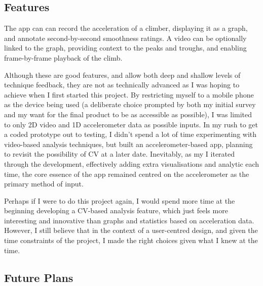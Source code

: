 \subsection{Features}
The app can can record the acceleration of a climber, displaying it as a graph, and annotate second-by-second smoothness ratings.
A video can be optionally linked to the graph, providing context to the peaks and troughs, and enabling frame-by-frame playback of the climb.

Although these are good features, and allow both deep and shallow levels of technique feedback, they are not as technically advanced as I was hoping to achieve when I first started this project.
By restricting myself to a mobile phone as the device being used (a deliberate choice prompted by both my initial survey and my want for the final product to be as accessible as possible), I was limited to only 2D video and 1D accelerometer data as possible inputs.
In my rush to get a coded prototype out to testing, I didn't spend a lot of time experimenting with video-based analysis techniques, but built an accelerometer-based app, planning to revisit the possibility of CV at a later date.
Inevitably, as my I iterated through the development, effectively adding extra visualisations and analytic each time, the core essence of the app remained centred on the accelerometer as the primary method of input.

Perhaps if I were to do this project again, I would spend more time at the beginning developing a CV-based analysis feature, which just feels more interesting and innovative than graphs and statistics based on acceleration data. 
However, I still believe that in the context of a user-centred design, and given the time constraints of the project, I made the right choices given what I knew at the time.





\subsection{Future Plans}

